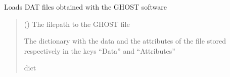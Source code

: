 \documentclass[letterpaper,10pt,english]{sphinxmanual}
\begin{document}
\begin{fulllineitems}
\label{\detokenize{_autosummary/HDF5_BLS.load_formats.load_dat:HDF5_BLS.load_formats.load_dat.load_dat_GHOST}}
\pysigstartsignatures
\pysiglinewithargsret
{}
{}
{}
\pysigstopsignatures
\sphinxAtStartPar
Loads DAT files obtained with the GHOST software
\begin{quote}\begin{description}
\sphinxAtStartPar
{} () \textendash{} The filepath to the GHOST file

\sphinxAtStartPar
The dictionary with the data and the attributes of the file stored respectively in the keys “Data” and “Attributes”

\sphinxAtStartPar
dict

\end{description}\end{quote}

\end{fulllineitems}

\end{document}

